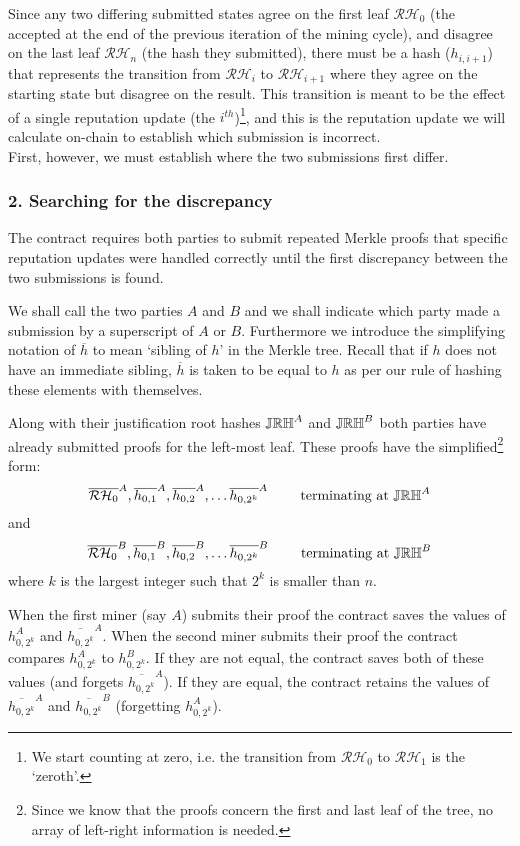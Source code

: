 Since any two differing submitted states agree on the first leaf $\mathcal{RH}_0$ (the  accepted at the end of the previous iteration of the mining cycle), and disagree on the last leaf $\mathcal{RH}_n$ (the hash they submitted), there must be a hash ($h_{i,i+1}$) that represents the transition from $\mathcal{RH}_i$ to $\mathcal{RH}_{i+1}$ where they agree on the starting state but disagree on the result. This transition is meant to be the effect of a single reputation update (the $i^{th}$)\footnote{We start counting at zero, i.e. the transition from $\mathcal{RH}_{0}$ to $\mathcal{RH}_{1}$ is the `zeroth'.}, and this is the reputation update we will calculate on-chain to establish which submission is incorrect.\\

\noindent First, however, we must establish where the two submissions first differ.

\subsubsection*{2. Searching for the discrepancy}
The contract requires both parties to submit repeated Merkle proofs that specific reputation updates were handled correctly until the first discrepancy between the two submissions is found.

We shall call the two parties $A$ and $B$ and we shall indicate which party made a submission by a superscript of $A$ or $B$. Furthermore we introduce the simplifying notation of $\overline{h}$ to mean `sibling of $h$' in the Merkle tree. Recall that if $h$ does not have an immediate sibling, $\overline{h}$ is taken to be equal to $h$ as per our rule of hashing these elements with themselves.

Along with their justification root hashes $\mathbb{JRH}^A$ and $\mathbb{JRH}^B$ both parties have already submitted proofs for the left-most leaf. These proofs have the simplified\footnote{Since we know that the proofs concern the first and last leaf of the tree, no array of left-right information is needed.} form:
\[
 \overline{\mathcal{RH}_0}^A, \overline{h_{0,1}}^A, \overline{h_{0,2}}^A, \ldots \overline{h_{0,2^k}}^A \qquad \textnormal{ terminating at } \mathbb{JRH}^A
\]
and
\[
 \overline{\mathcal{RH}_0}^B, \overline{h_{0,1}}^B, \overline{h_{0,2}}^B, \ldots \overline{h_{0,2^k}}^B \qquad \textnormal{ terminating at } \mathbb{JRH}^B
\]
where $k$ is the largest integer such that $2^k$ is smaller than $n$.

When the first miner (say $A$) submits their proof the contract saves the values of $h_{0,2^k}^A$ and $\overline{h_{0,2^k}}^A$. When the second miner submits their proof the contract compares $h_{0,2^k}^A$ to $h_{0,2^k}^B$. If they are not equal, the contract saves both of these values (and forgets $\overline{h_{0,2^k}}^A$). If they are equal, the contract retains the values of $\overline{h_{0,2^k}}^A$ and $\overline{h_{0,2^k}}^B$ (forgetting $h_{0,2^k}^A$).

